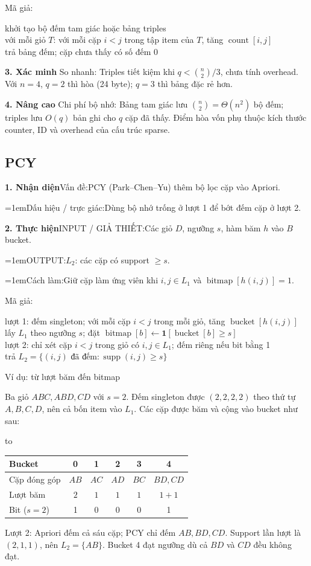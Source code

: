 \documentclass[10pt,a4paper,twocolumn]{article}
\makeatletter
\newif\ifexamheadingprinted
\newcommand{\topic}[2]{%
  \global\examheadingprintedfalse\par\subsection{#2}\label{topic:#1}}
\newcommand{\key}[1]{#1:\enspace}
\newcommand{\blocklabel}[1]{\par\noindent#1\par\nobreak}
\newenvironment{examtable}[1]{%
  \par\addvspace{2pt}\noindent\hbox to \linewidth\bgroup\hfil
  \setlength{\tabcolsep}{4pt}%
  \renewcommand{\arraystretch}{1.12}\begin{tabular}{#1}%
}{\end{tabular}\hfil\egroup\par\addvspace{2pt}}
\newcommand{\algfield}[2]{\par\noindent\hangindent=1em\relax#1:\enspace#2}
\newcommand{\unitheading}[2]{%
  \par\addvspace{1pt}\noindent\textbf{#1. #2}\enspace}
\newcommand{\unitverification}{\unitheading{3}{Xác minh}}
\newcommand{\unitadvanced}{\unitheading{4}{Nâng cao}}
\newcommand{\unitfield}[4]{%
  \par\noindent\textbf{#1. #2}\enspace #3:\enspace #4}
\newcommand{\algsummary}[6]{%
  \begingroup\setlength{\parskip}{1pt}%
  \unitfield{1}{Nhận diện}{Vấn đề}{#1}%
  \algfield{Dấu hiệu / trực giác}{#2}%
  \if\relax\detokenize{#3}\relax\else\par\noindent#3\par\fi%
  \unitfield{2}{Thực hiện}{INPUT / GIẢ THIẾT}{#4}%
  \algfield{OUTPUT}{#5}%
  \algfield{Cách làm}{#6}\par\endgroup}
\newenvironment{algpseudo}{%
  \par\addvspace{2pt}\noindent
  \setlength{\parskip}{0pt}%
  Mã giả:\par\nobreak
  \begin{list}{}{\setlength{\leftmargin}{1em}\setlength{\topsep}{0pt}%
    \setlength{\partopsep}{0pt}\setlength{\parsep}{0pt}%
    \@beginparpenalty=10000\relax}%
  \item\relax
}{\end{list}\par\addvspace{3pt}}
\makeatother
\begin{document}
\begin{algpseudo}
khởi tạo bộ đếm tam giác hoặc bảng triples\\
với mỗi giỏ $T$: với mỗi cặp $i<j$ trong tập item của $T$, tăng $\operatorname{count}[i,j]$\\
trả bảng đếm; cặp chưa thấy có số đếm 0
\end{algpseudo}

\unitverification
\key{So nhanh} Triples tiết kiệm khi $q<\binom n2/3$, chưa tính overhead. Với $n=4$, $q=2$ thì hòa (24 byte); $q=3$ thì bảng đặc rẻ hơn.

\unitadvanced
\key{Chi phí bộ nhớ} Bảng tam giác lưu $\binom n2=\Theta(n^2)$ bộ đếm; triples lưu $O(q)$ bản ghi cho $q$ cặp đã thấy. Điểm hòa vốn phụ thuộc kích thước counter, ID và overhead của cấu trúc sparse.
\topic{pcy}{PCY}

\algsummary{PCY (Park--Chen--Yu) thêm bộ lọc cặp vào Apriori.}{Dùng bộ nhớ trống ở lượt 1 để bớt đếm cặp ở lượt 2.}{}{Các giỏ $D$, ngưỡng $s$, hàm băm $h$ vào $B$ bucket.}{$L_2$: các cặp có support $\ge s$.}{Giữ cặp làm ứng viên khi $i,j\in L_1$ và $\operatorname{bitmap}[h(i,j)]=1$.}

\begin{algpseudo}
lượt 1: đếm singleton; với mỗi cặp $i<j$ trong mỗi giỏ, tăng $\operatorname{bucket}[h(i,j)]$\\
lấy $L_1$ theo ngưỡng $s$; đặt $\operatorname{bitmap}[b]\gets\mathbf1[\operatorname{bucket}[b]\ge s]$\\
lượt 2: chỉ xét cặp $i<j$ trong giỏ có $i,j\in L_1$; đếm riêng nếu bit bằng 1\\
trả $L_2=\{(i,j)\text{ đã đếm}:\operatorname{supp}(i,j)\ge s\}$
\end{algpseudo}

\blocklabel{Ví dụ: từ lượt băm đến bitmap}
Ba giỏ $ABC,ABD,CD$ với $s=2$. Đếm singleton được $(2,2,2,2)$ theo thứ tự $A,B,C,D$, nên cả bốn item vào $L_1$. Các cặp được băm và cộng vào bucket như sau:
\begin{examtable}{@{}lccccc@{}}
\toprule
Bucket & 0 & 1 & 2 & 3 & 4 \\
\midrule
Cặp đóng góp & $AB$ & $AC$ & $AD$ & $BC$ & $BD,CD$ \\
Lượt băm & $2$ & $1$ & $1$ & $1$ & $1+1$ \\
Bit ($s=2$) & 1 & 0 & 0 & 0 & 1 \\
\bottomrule
\end{examtable}
Lượt 2: Apriori đếm cả sáu cặp; PCY chỉ đếm $AB,BD,CD$. Support lần lượt là $(2,1,1)$, nên $L_2=\{AB\}$. Bucket 4 đạt ngưỡng dù cả $BD$ và $CD$ đều không đạt.
\end{document}
